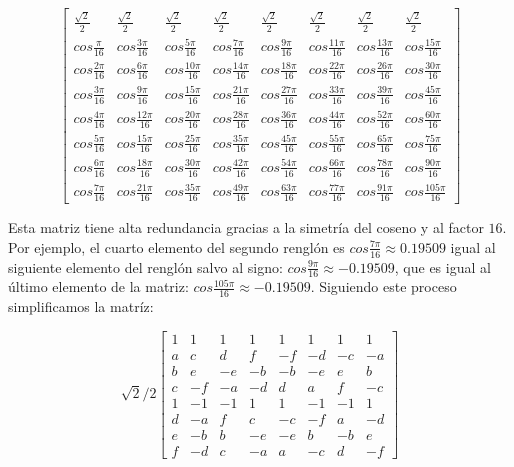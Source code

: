 \begin{equation}
    \label{eq:dct-matrix}
    \begin{bmatrix}
        \frac{\sqrt{2}}{2} & \frac{\sqrt{2}}{2} & \frac{\sqrt{2}}{2} & \frac{\sqrt{2}}{2} & \frac{\sqrt{2}}{2} & \frac{\sqrt{2}}{2} & \frac{\sqrt{2}}{2} & \frac{\sqrt{2}}{2} \\
        cos\frac{\pi}{16} & cos\frac{3\pi}{16}& cos\frac{5\pi}{16}& cos\frac{7\pi}{16}& cos\frac{9\pi}{16}& cos\frac{11\pi}{16}& cos\frac{13\pi}{16}& cos\frac{15\pi}{16} \\
        cos\frac{2\pi}{16} & cos\frac{6\pi}{16}& cos\frac{10\pi}{16}& cos\frac{14\pi}{16}& cos\frac{18\pi}{16}& cos\frac{22\pi}{16}& cos\frac{26\pi}{16}& cos\frac{30\pi}{16} \\
        cos\frac{3\pi}{16} & cos\frac{9\pi}{16}& cos\frac{15\pi}{16}& cos\frac{21\pi}{16}& cos\frac{27\pi}{16}& cos\frac{33\pi}{16}& cos\frac{39\pi}{16}& cos\frac{45\pi}{16} \\
        cos\frac{4\pi}{16} & cos\frac{12\pi}{16}& cos\frac{20\pi}{16}& cos\frac{28\pi}{16}& cos\frac{36\pi}{16}& cos\frac{44\pi}{16}& cos\frac{52\pi}{16}& cos\frac{60\pi}{16} \\
        cos\frac{5\pi}{16} & cos\frac{15\pi}{16}& cos\frac{25\pi}{16}& cos\frac{35\pi}{16}& cos\frac{45\pi}{16}& cos\frac{55\pi}{16}& cos\frac{65\pi}{16}& cos\frac{75\pi}{16} \\
        cos\frac{6\pi}{16} & cos\frac{18\pi}{16}& cos\frac{30\pi}{16}& cos\frac{42\pi}{16}& cos\frac{54\pi}{16}& cos\frac{66\pi}{16}& cos\frac{78\pi}{16}& cos\frac{90\pi}{16} \\
        cos\frac{7\pi}{16} & cos\frac{21\pi}{16}& cos\frac{35\pi}{16}& cos\frac{49\pi}{16}& cos\frac{63\pi}{16}& cos\frac{77\pi}{16}& cos\frac{91\pi}{16}& cos\frac{105\pi}{16}
    \end{bmatrix}
\end{equation}

Esta matriz tiene alta redundancia gracias a la simetría del coseno y al factor $16$. Por ejemplo, el cuarto elemento del segundo renglón es $cos\frac{7\pi}{16} \approx 0.19509$ igual al siguiente elemento del renglón salvo al signo: $cos\frac{9\pi}{16} \approx -0.19509$, que es igual al último elemento de la matriz: $cos\frac{105\pi}{16} \approx -0.19509$. Siguiendo este proceso simplificamos la matríz:

\begin{equation}
    \label{eq:dct-matrix-simple}
    \sqrt{2}/2
    \begin{bmatrix}
        1 & 1 & 1 & 1 & 1 & 1 & 1 & 1  \\
        a & c & d & f & -f & -d & -c & -a \\
        b & e & -e & -b & -b & -e & e & b \\
        c & -f & -a & -d & d & a & f & -c \\
        1 & -1 & -1 & 1 & 1 & -1 & -1 & 1\\
        d & -a & f & c & -c & -f & a & -d \\
        e & -b & b & -e & -e & b & -b & e \\
        f & -d & c & -a & a & -c & d & -f
    \end{bmatrix}
\end{equation}

